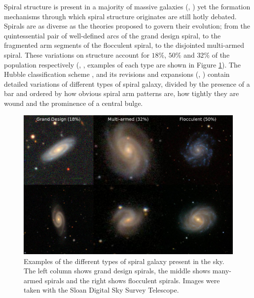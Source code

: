 
Spiral structure is present in a majority of massive galaxies (\citealt{1989gadv.book..151B}, \citealt{2008MNRAS.389.1179L}) yet the formation mechanisms through which spiral structure originates are still hotly debated. Spirals are as diverse as the theories proposed to govern their evolution; from the quintessential pair of well-defined arcs of the grand design spiral, to the fragmented arm segments of the flocculent spiral, to the disjointed multi-armed spiral. These variations on structure account for $18\%$, $50\%$ and $32\%$ of the population respectively (\citealt{2011ApJ...737...32E}, \citealt{2015yCat..22170032B}, examples of each type are shown in Figure \ref{fig:spiral-galaxy-types}). The Hubble classification scheme \citep{1926ApJ....64..321H}, and its revisions and expansions (\citealt{1961hag..book.....S}, \citealt{1991rc3..book.....D}) contain detailed variations of different types of spiral galaxy, divided by the presence of a bar and ordered by how obvious spiral arm patterns are, how tightly they are wound and the prominence of a central bulge.

\begin{figure}
  \includegraphics[width=13cm]{plots/galaxy_types.png}
  \caption{Examples of the different types of spiral galaxy present in the sky. The left column shows grand design spirals, the middle shows many-armed spirals and the right shows flocculent spirals. Images were taken with the Sloan Digital Sky Survey Telescope.}
  \label{fig:spiral-galaxy-types}
\end{figure}

